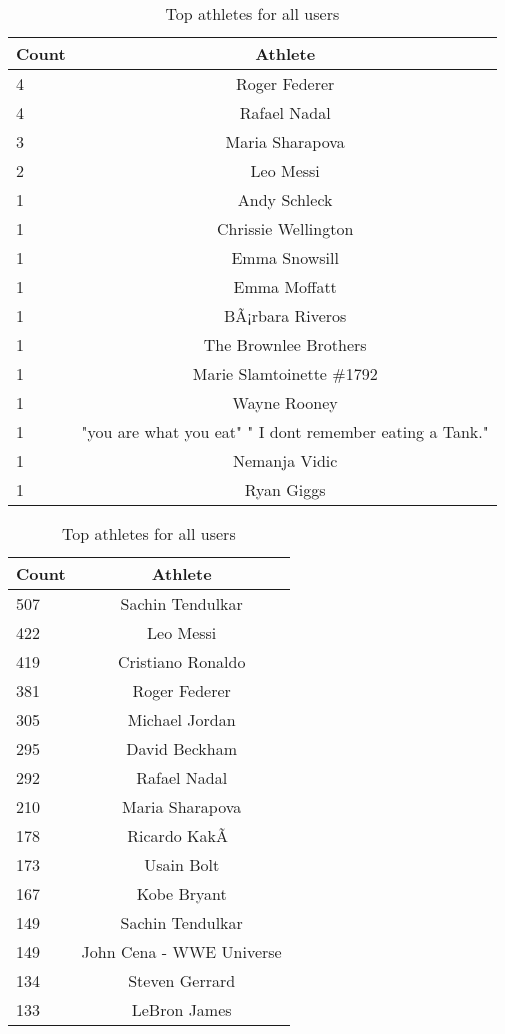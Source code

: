 \begin{table}[h]
\begin{minipage}[b]{.50\textwidth}
\centering
  \begin{tabular}{|l|c|} %
  \hline
  		\textbf{Count} & \textbf{Athlete} \\ \hline
  		4 & Roger Federer \\ \hline
		4 & Rafael Nadal \\ \hline
		3 & Maria Sharapova \\ \hline
		2 & Leo Messi \\ \hline
		1 & Andy Schleck \\ \hline
		1 & Chrissie Wellington \\ \hline
		1 & Emma Snowsill \\ \hline
		1 & Emma Moffatt \\ \hline
		1 & BÃ¡rbara Riveros \\ \hline
		1 & The Brownlee Brothers \\ \hline
		1 & Marie Slamtoinette \#1792 \\ \hline
		1 & Wayne Rooney \\ \hline
		1 & "you are what you eat" " I dont remember eating a Tank." \\ \hline
		1 & Nemanja Vidic \\ \hline
		1 & Ryan Giggs \\ \hline
  \end{tabular}
  \caption{Top athletes for app users}
\end{minipage}
\begin{minipage}[b]{.50\textwidth}
\centering
  \begin{tabular}{|l|c|} %
  \hline
  		\textbf{Count} & \textbf{Athlete} \\ \hline
  		507 & Sachin Tendulkar \\ \hline
		422 & Leo Messi \\ \hline
		419 & Cristiano Ronaldo \\ \hline
		381 & Roger Federer \\ \hline
		305 & Michael Jordan \\ \hline
		295 & David Beckham \\ \hline
		292 & Rafael Nadal \\ \hline
		210 & Maria Sharapova \\ \hline
		178 & Ricardo KakÃ  \\ \hline
		173 & Usain Bolt \\ \hline
		167 & Kobe Bryant \\ \hline
		149 & Sachin Tendulkar \\ \hline
		149 & John Cena - WWE Universe \\ \hline
		134 & Steven Gerrard \\ \hline
		133 & LeBron James \\ \hline
  \end{tabular}
  \caption{Top athletes for all users}
\end{minipage}


\end{table}
